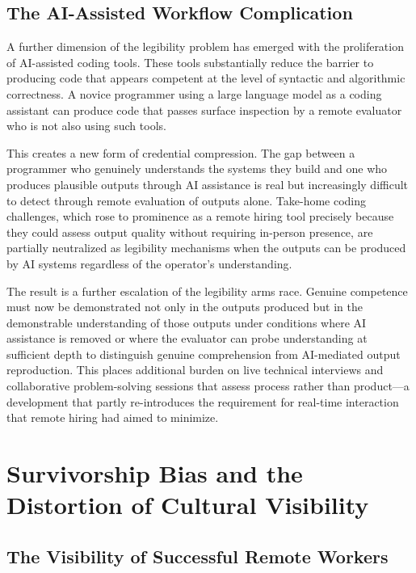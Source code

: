 \documentclass[12pt, a4paper]{article}
\theoremstyle{plain}
\theoremstyle{definition}
\theoremstyle{remark}
\begin{document}
\subsection{The AI-Assisted Workflow Complication}

A further dimension of the legibility problem has emerged with the proliferation
of AI-assisted coding tools.
These tools substantially reduce the barrier to producing code that appears competent
at the level of syntactic and algorithmic correctness.
A novice programmer using a large language model as a coding assistant
can produce code that passes surface inspection by a remote evaluator
who is not also using such tools.

This creates a new form of credential compression.
The gap between a programmer who genuinely understands the systems they build
and one who produces plausible outputs through AI assistance is real
but increasingly difficult to detect through remote evaluation of outputs alone.
Take-home coding challenges, which rose to prominence as a remote hiring tool
precisely because they could assess output quality without requiring in-person presence,
are partially neutralized as legibility mechanisms when the outputs can be produced
by AI systems regardless of the operator's understanding.

The result is a further escalation of the legibility arms race.
Genuine competence must now be demonstrated not only in the outputs produced
but in the demonstrable understanding of those outputs under conditions
where AI assistance is removed or where the evaluator can probe understanding
at sufficient depth to distinguish genuine comprehension from
AI-mediated output reproduction.
This places additional burden on live technical interviews and
collaborative problem-solving sessions that assess process rather than product---a development
that partly re-introduces the requirement for real-time interaction
that remote hiring had aimed to minimize.

\section{Survivorship Bias and the Distortion of Cultural Visibility}
\label{sec:survivorship}

\subsection{The Visibility of Successful Remote Workers}
\end{document}
